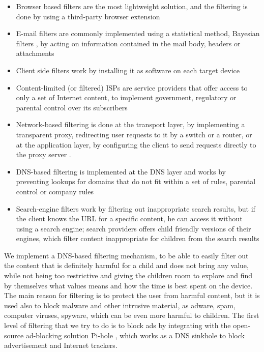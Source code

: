 \begin{itemize}
\item Browser based filters are the most lightweight solution, and the filtering is done by using a third-party browser extension
\item E-mail filters are commonly implemented using a statistical method, Bayesian filters \citep{sahami1998bayesian}, by acting on information contained in the mail body, headers or attachments
\item Client side filters work by installing it as software on each target device
\item Content-limited (or filtered) ISPs are service providers that offer access to only a set of Internet content, to implement government, regulatory or parental control over its subscribers
\item Network-based filtering is done at the transport layer, by implementing a transparent proxy, redirecting user requests to it by a switch or a router, or at the application layer, by configuring the client to send requests directly to the proxy server \citep{contentGateway}.
\item DNS-based filtering \citep{sarvepalli2017dns} is implemented at the DNS layer and works by preventing lookups for domains that do not fit within a set of rules, parental control or company rules
\item Search-engine filters work by filtering out inappropriate search results, but if the client knows the URL for a specific content, he can access it without using a search engine; search providers offers child friendly versions of their engines, which filter content inappropriate for children from the search results
\end{itemize}

We implement a DNS-based filtering mechanism, to be able to easily filter out the content that is definitely harmful for a child and does not bring any value, while not being too restrictive and giving the children room to explore and find by themselves what values means and how the time is best spent on the device. The main reason for filtering is to protect the user from harmful content, but it is used also to block malware and other intrusive material, as adware, spam, computer viruses, spyware, which can be even more harmful to children. The first level of filtering that we try to do is to block ads by integrating with the open-source ad-blocking solution Pi-hole \citep{pot2015adblock}, which works as a DNS sinkhole to block advertisement and Internet trackers.

